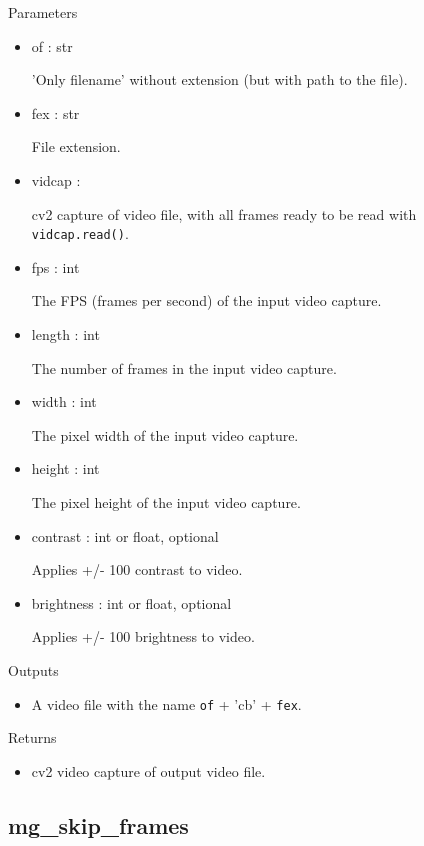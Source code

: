 \documentclass[9pt]{extarticle}
\def\code#1{\texttt{#1}}
\begin{document}
\noindent Parameters
\begin{itemize}
\item of : str

'Only filename' without extension (but with path to the file).

\item fex : str

File extension.

\item vidcap : 

cv2 capture of video file, with all frames ready to be 
read with \code{vidcap.read()}.

\item fps : int

The FPS (frames per second) of the input video capture.

\item length : int

The number of frames in the input video capture.

\item width : int

The pixel width of the input video capture. 

\item height : int

The pixel height of the input video capture. 

\item contrast : int or float, optional

Applies +/- 100 contrast to video.

\item brightness : int or float, optional

Applies +/- 100 brightness to video.
\end{itemize}

\noindent Outputs
\begin{itemize}
\item A video file with the name \code{of} + 'cb' + \code{fex}.
\end{itemize}

\noindent Returns
\begin{itemize}
\item cv2 video capture of output video file.
\end{itemize}


\subsection{mg\_skip\_frames}
\end{document}
